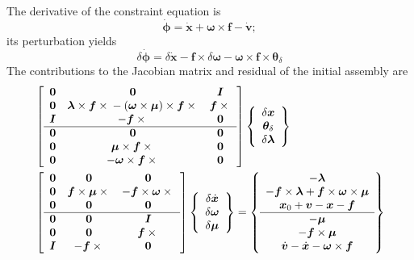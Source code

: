 \documentclass[10pt,dvips,fleqn,subeqn]{report}
\newcommand{\T}[1]{\bm{#1}}
\begin{document}
The derivative of the constraint equation is
\begin{equation}
	\dot{\T{\phi}}
	= \dot{\T{x}}
	+ \T{\omega}\times\T{f}
	- \dot{\T{v}} ;
\end{equation}
its perturbation yields
\begin{equation}
	\delta\dot{\T{\phi}}
	= \delta\dot{\T{x}}
	- \T{f}\times\delta\T{\omega}
	- \T{\omega}\times\T{f}\times\T{\theta}_{\delta}
\end{equation}
The contributions to the Jacobian matrix and residual 
of the initial assembly are
\begin{align}
	& \sqbr{\matr{ccc}{
		\T{0} & \T{0} & \T{I} \\				%
		\T{0} & \T{\lambda}\times\T{f}\times{}
			- \plbr{\T{\omega}\times\T{\mu}}\times\T{f}\times{} &
			\T{f}\times{} \\				%
		\T{I} & -\T{f}\times{} & \T{0} \\			%
%
	\hline
		\T{0} & \T{0} & \T{0} \\				%
		\T{0} & \T{\mu}\times\T{f}\times{} & \T{0} \\		%
		\T{0} & -\T{\omega}\times\T{f}\times{} & \T{0}		%
	}} \cubr{\cvvect{
		\delta\T{x} \\
		\T{\theta}_{\delta} \\
		\delta\T{\lambda}
	}} \nonumber \\
	& \sqbr{\matr{ccc}{
		\T{0} & \T{0} & \T{0} \\				%
		\T{0} & \T{f}\times\T{\mu}\times{} &
			-\T{f}\times\T{\omega}\times{} \\		%
		\T{0} & \T{0} & \T{0} \\				%
%
	\hline
		\T{0} & \T{0} & \T{I} \\				%
		\T{0} & \T{0} & \T{f}\times{} \\			%
		\T{I} & -\T{f}\times{} & \T{0} 				%
	}} \cubr{\cvvect{
		\delta\dot{\T{x}} \\
		\delta\T{\omega} \\
		\delta\T{\mu}
	}} %
	= \cubr{\cvvect{
		- \T{\lambda} \\
		- \T{f}\times\T{\lambda}
			+ \T{f}\times\T{\omega}\times\T{\mu} \\
		\T{x}_0 + \T{v} - \T{x} - \T{f} \\
%
	\hline
		- \T{\mu} \\
		- \T{f}\times\T{\mu} \\
		\dot{\T{v}} - \dot{\T{x}} - \T{\omega}\times\T{f}
	}}
\end{align}
\end{document}
